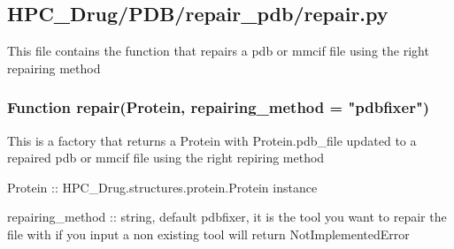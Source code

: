 

\subsection{HPC\_Drug/PDB/repair\_pdb/repair.py}

    This file contains the function that repairs a pdb or mmcif file using the right repairing method

    \subsubsection{Function repair(Protein, repairing\_method = "pdbfixer")}

        This is a factory that returns a Protein with Protein.pdb\_file updated to a repaired pdb or mmcif file using the right repiring method

        Protein :: HPC\_Drug.structures.protein.Protein instance

        repairing\_method :: string, default pdbfixer, it is the tool you want to repair the file with if you input a non existing tool will return NotImplementedError